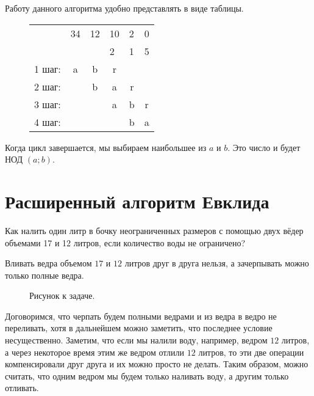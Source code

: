 \documentclass[russian]{lecture-notes}
\begin{document}
\begin{example} Работу данного алгоритма удобно представлять в виде таблицы.
        \begin{figure}[h!]
            \begin{tabular}{cccccc}
            \cline{2-6}
            \multicolumn{1}{l|}{} & \multicolumn{1}{l|}{34} & \multicolumn{1}{l|}{12} & \multicolumn{1}{l|}{10} & \multicolumn{1}{l|}{2} & \multicolumn{1}{l|}{0} \\ \cline{2-6}
            \multicolumn{1}{l|}{} & \multicolumn{1}{l|}{}   & \multicolumn{1}{l|}{}   & \multicolumn{1}{l|}{2}  & \multicolumn{1}{l|}{1} & \multicolumn{1}{l|}{5} \\ \cline{2-6}
            1 шаг: & a & b & r &  &  \\
            2 шаг: &  & b & a & r &  \\
            3 шаг: &  &  & a & b & r \\
            4 шаг: &  &  &  & b & a
            \end{tabular}
    \end{figure}
\end{example}

Когда цикл завершается, мы выбираем наибольшее из $a$ и $b$. Это число и будет НОД $(a;b)$.

\newpage

\section{Расширенный алгоритм Евклида}

\begin{problem}
    Как налить один литр в бочку неограниченных размеров с помощью двух вёдер объемами 17 и 12 литров, если количество воды не ограничено?
\end{problem}

\begin{note}
    Вливать ведра объемом $17$ и $12$ литров друг в друга нельзя, а зачерпывать можно только полные ведра.
\end{note}

\begin{figure}[h!]
  \centering
  

  Рисунок к задаче.
\end{figure}

Договоримся, что черпать будем полными ведрами и из ведра в ведро не переливать, хотя в дальнейшем можно заметить, что последнее условие несущественно. Заметим, что если мы налили воду, например, ведром $12$ литров, а через некоторое время этим же ведром отлили $12$ литров, то эти две операции компенсировали друг друга и их можно просто не делать. Таким образом, можно считать, что  одним ведром мы будем только наливать воду, а другим только отливать.
\end{document}
